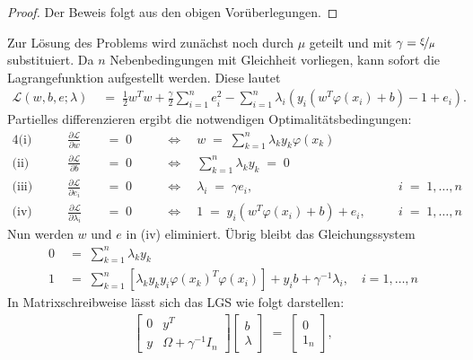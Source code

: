 \begin{proof}
	Der Beweis folgt aus den obigen Vorüberlegungen.
\end{proof}
Zur Lösung des Problems wird zunächst noch durch \(\mu\) geteilt und mit \(\gamma=\nicefrac{\xi}{\mu}\) substituiert. Da \(n\) Nebenbedingungen mit Gleichheit vorliegen, kann sofort die Lagrangefunktion aufgestellt werden. Diese lautet
\begin{align*}
	\mathcal{L}(w,b,e;\lambda)&\;=\;\frac{1}{2}w^Tw+\frac{\gamma}{2}\sum_{i=1}^{n}e_i^2-\sum_{i=1}^{n}\lambda_i\left(y_i\left(w^T\varphi(x_i)+b\right)-1+e_i\right).
\end{align*}
Partielles differenzieren ergibt die notwendigen  Optimalitätsbedingungen:
\begin{alignat*}{4}
	\text{(i)}&\qquad \frac{\partial \mathcal{L}}{\partial w} &&\;=\;0 && \quad\Leftrightarrow\quad w\;=\;\sum_{k=1}^{n}\lambda_ky_k\varphi(x_k) && \\[0,3cm]
	\text{(ii)}&\qquad \frac{\partial \mathcal{L}}{\partial b} &&\;=\;0 && \quad\Leftrightarrow\quad \sum_{k=1}^{n}\lambda_ky_k\;=\;0 && \\[0,3cm]
	\text{(iii)}&\qquad \frac{\partial \mathcal{L}}{\partial e_i} &&\;=\;0 && \quad\Leftrightarrow\quad \lambda_i\;=\;\gamma e_i, && i\;=\;1,\dots,n\\[0,3cm]
	\text{(iv)}&\qquad \frac{\partial \mathcal{L}}{\partial \lambda_i} &&\;=\;0 && \quad\Leftrightarrow\quad 1\;=\;y_i\left(w^T\varphi(x_i)+b\right)+e_i,\quad && i\;=\;1,\dots,n
\end{alignat*}
Nun werden \(w\) und \(e\) in (iv) eliminiert. Übrig bleibt das Gleichungssystem
\begin{align*}
	0&\;=\;\sum_{k=1}^{n}\lambda_ky_k\\
	1&\;=\;\sum_{k=1}^{n}\left[\lambda_ky_ky_i\varphi(x_k)^T\varphi(x_i)\right]+y_ib+\gamma^{-1}\lambda_i,\quad i=1,\dots,n
\end{align*}
In Matrixschreibweise lässt sich das LGS wie folgt darstellen:
\begin{align*}
	\begin{bmatrix}
		0& y^T \\[0,5cm]
		y& \Omega+\gamma^{-1}I_n
	\end{bmatrix}
	\begin{bmatrix}
		b \\[0,2cm]
		\lambda
	\end{bmatrix}\;=\;
	\begin{bmatrix}
		0 \\[0,2cm] 
		1_n
	\end{bmatrix},
\end{align*}
